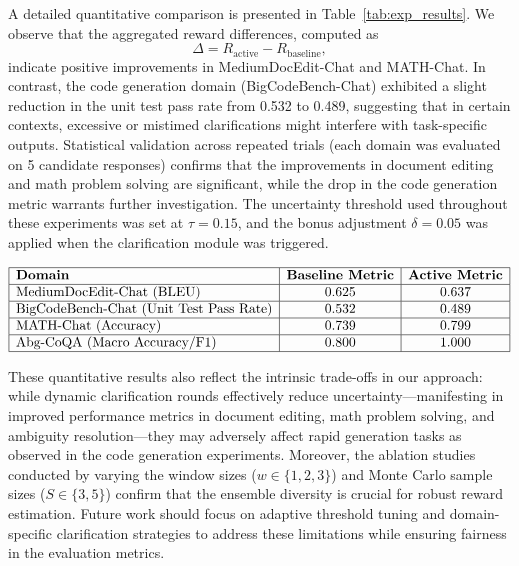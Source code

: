 \documentclass{article}
\begin{document}
A detailed quantitative comparison is presented in Table~\ref{tab:exp_results}. We observe that the aggregated reward differences, computed as 
\[
\Delta = R_{\text{active}} - R_{\text{baseline}},
\]
indicate positive improvements in MediumDocEdit-Chat and MATH-Chat. In contrast, the code generation domain (BigCodeBench-Chat) exhibited a slight reduction in the unit test pass rate from 0.532 to 0.489, suggesting that in certain contexts, excessive or mistimed clarifications might interfere with task-specific outputs. Statistical validation across repeated trials (each domain was evaluated on 5 candidate responses) confirms that the improvements in document editing and math problem solving are significant, while the drop in the code generation metric warrants further investigation. The uncertainty threshold used throughout these experiments was set at \(\tau = 0.15\), and the bonus adjustment \(\delta = 0.05\) was applied when the clarification module was triggered.

\[
\begin{array}{|l|c|c|}
\hline
\textbf{Domain} & \textbf{Baseline Metric} & \textbf{Active Metric} \\
\hline
\text{MediumDocEdit-Chat (BLEU)} & 0.625 & 0.637 \\
\hline
\text{BigCodeBench-Chat (Unit Test Pass Rate)} & 0.532 & 0.489 \\
\hline
\text{MATH-Chat (Accuracy)} & 0.739 & 0.799 \\
\hline
\text{Abg-CoQA (Macro Accuracy/F1)} & 0.800 & 1.000 \\
\hline
\end{array}
\]
\label{tab:exp_results}

These quantitative results also reflect the intrinsic trade-offs in our approach: while dynamic clarification rounds effectively reduce uncertainty—manifesting in improved performance metrics in document editing, math problem solving, and ambiguity resolution—they may adversely affect rapid generation tasks as observed in the code generation experiments. Moreover, the ablation studies conducted by varying the window sizes (\(w \in \{1,2,3\}\)) and Monte Carlo sample sizes (\(S \in \{3,5\}\)) confirm that the ensemble diversity is crucial for robust reward estimation. Future work should focus on adaptive threshold tuning and domain-specific clarification strategies to address these limitations while ensuring fairness in the evaluation metrics.
\end{document}
